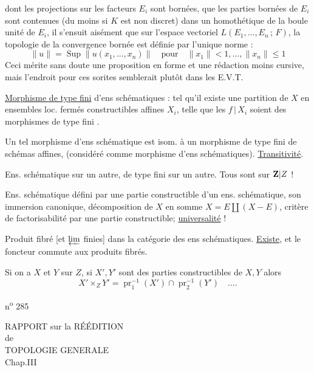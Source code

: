 dont les projections sur les facteurs $E_i$ sont bornées, que les parties bornées de $E_i$ sont contenues (du moins si $K$ est non discret) dans un homothétique de la boule unité de $E_i$, il s'ensuit aisément que sur l'espace vectoriel $L(E_1,\ldots,E_n\,;\,F)$, la topologie de la convergence bornée est définie par l'unique norme :
\[
\|u\|=\operatorname{Sup}\|u(x_1,\ldots,x_n)\|\quad\text{pour}\quad\|x_1\|<1,\ldots,\|x_n\|\leq1
\]
Ceci mérite sans doute une proposition en forme et une rédaction moins cursive, mais l'endroit pour ces sorites semblerait plutôt dans les E.V.T.

\uline{Morphisme de type fini}  d'ens schématiques : tel qu'il existe une partition de $X$ en ensembles loc. fermés constructibles affines $X_i$, telle que les $f\,|\,X_i$ soient des morphismes de type fini .


Un tel morphisme d'ens schématique est isom. à un morphisme de type fini de schémas affines, (considéré comme morphisme d'ens schématiques). \uline{Transitivité}.

Ens. schématique sur un autre, de type fini sur un autre. Tous sont sur $\mathbf Z|Z$ !

Ens. schématique défini par une partie constructible d'un ens. schématique, son immersion canonique, décomposition de $X$ en somme $X=E\amalg(X-E)$, critère de factorisabilité par une partie constructible; \uline{universalité} !

Produit fibré [et $\varprojlim$ finies] dans la catégorie des ens schématiques. \uline{Existe}, et le foncteur 
commute aux produits fibrés.

Si on a $X$ et $Y$ sur $Z$, si $X',Y'$ sont des parties constructibles de $X,Y$ alors
\[
X'\times_ZY'=\operatorname{pr}_1^{-1}(X')\cap\operatorname{pr}_2^{-1}(Y')\quad\ldots.
\]

\hfill n\textsuperscript{o} 285
\begin{center}
RAPPORT sur la RÉÉDITION\\
de\\
TOPOLOGIE GENERALE\\
Chap.III
\end{center}

